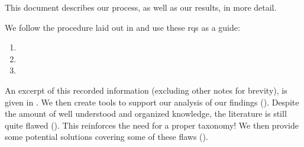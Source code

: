 This document describes our process, as well as our results, in more detail.

We follow the procedure laid out in  and use these \acfp{rq}
as a guide:
\begin{enumerate}
    \item \rqatext{}
    \item \rqbtext{}
    \item \rqctext{}
\end{enumerate}
\ifnotpaper An excerpt of this recorded information (excluding other notes for
    brevity), is given in . \fi We then
create tools to support our analysis of our findings ().
Despite the amount of well understood and organized knowledge, the literature
is still quite flawed (). This reinforces the need for a proper
taxonomy! We then provide some potential solutions covering some of these
flaws ().

\ifnotpaper
    \begin{landscape}
        
    \end{landscape}
\fi